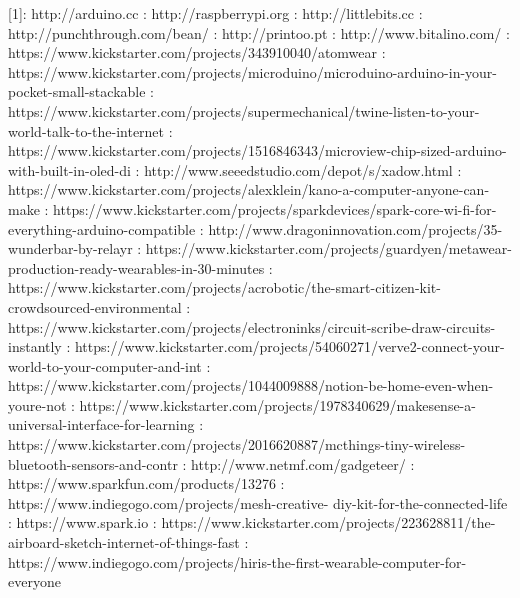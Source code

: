 	[1]: http://arduino.cc  \newline
	[2]: http://raspberrypi.org  \newline
	[3]: http://littlebits.cc  \newline
	[4]: http://punchthrough.com/bean/ \newline
	[5]: http://printoo.pt \newline
	[6]: http://www.bitalino.com/ \newline
	[7]: https://www.kickstarter.com/projects/343910040/atomwear \newline
	[8]: https://www.kickstarter.com/projects/microduino/microduino-arduino-in-your-pocket-small-stackable \newline
	[9]: https://www.kickstarter.com/projects/supermechanical/twine-listen-to-your-world-talk-to-the-internet \newline
	[10]: https://www.kickstarter.com/projects/1516846343/microview-chip-sized-arduino-with-built-in-oled-di \newline
	[11]: http://www.seeedstudio.com/depot/s/xadow.html \newline
	[12]: https://www.kickstarter.com/projects/alexklein/kano-a-computer-anyone-can-make \newline
	[13]: https://www.kickstarter.com/projects/sparkdevices/spark-core-wi-fi-for-everything-arduino-compatible \newline
	[14]: http://www.dragoninnovation.com/projects/35-wunderbar-by-relayr \newline
	[15]: https://www.kickstarter.com/projects/guardyen/metawear-production-ready-wearables-in-30-minutes  \newline
	[16]: https://www.kickstarter.com/projects/acrobotic/the-smart-citizen-kit-crowdsourced-environmental \newline
	[17]: https://www.kickstarter.com/projects/electroninks/circuit-scribe-draw-circuits-instantly \newline
	[18]: https://www.kickstarter.com/projects/54060271/verve2-connect-your-world-to-your-computer-and-int \newline
	[19]: https://www.kickstarter.com/projects/1044009888/notion-be-home-even-when-youre-not \newline
	[20]: https://www.kickstarter.com/projects/1978340629/makesense-a-universal-interface-for-learning \newline
	[21]: https://www.kickstarter.com/projects/2016620887/mcthings-tiny-wireless-bluetooth-sensors-and-contr \newline
	[22]: http://www.netmf.com/gadgeteer/ \newline
	[23]: https://www.sparkfun.com/products/13276 \newline
	[24]: https://www.indiegogo.com/projects/mesh-creative- \newline diy-kit-for-the-connected-life \newline
	[25]: https://www.spark.io \newline
	[26]: https://www.kickstarter.com/projects/223628811/the-airboard-sketch-internet-of-things-fast  \newline
	[27]: https://www.indiegogo.com/projects/hiris-the-first-wearable-computer-for-everyone \newline

	






